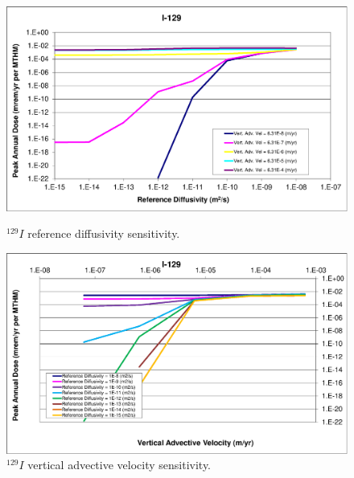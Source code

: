 \begin{figure}[htp!]
\begin{minipage}[b]{0.45\linewidth}
\centering
\includegraphics[width=\linewidth]{./chapters/nuclide_sensitivity/clay/AdvVelAndDiffCoeffEBSFail/I-129.eps}
\caption{$^{129}I$ reference diffusivity sensitivity.}
\label{fig:VAdvVelI129}

\end{minipage}
\hspace{0.05\linewidth}
\begin{minipage}[b]{0.45\linewidth}

\includegraphics[width=\linewidth]{./chapters/nuclide_sensitivity/clay/AdvVelAndDiffCoeffEBSFail/I-129-VAdvVel.eps}
\caption{$^{129}I$ vertical advective velocity sensitivity.}
\label{fig:VAdvVelI129VAdvVel}

\end{minipage}
\end{figure}

